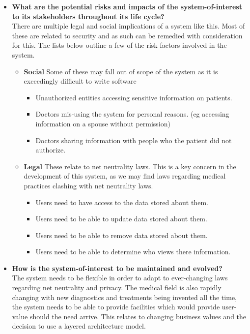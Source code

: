 \documentclass[10pt,oneside]{report}
\begin{document}
\begin{itemize}
\item \textbf{What are the potential risks and impacts of the system-of-interest to its stakeholders throughout its life cycle?} \\
There are multiple legal and social implications of a system like this. Most of these are related to security and as such can be remedied with consideration for this. The lists below outline a few of the risk factors involved in the system.
\begin{itemize}
	\item \textbf{Social}
		Some of these may fall out of scope of the system as it is exceedingly difficult to write software 
		\begin{itemize}
			\item Unauthorized entities accessing sensitive information on patients.
			\item Doctors mis-using the system for personal reasons. (eg accessing information on a spouse without permission)
			\item Doctors sharing information with people who the patient did not authorize.
		\end{itemize}
	\item \textbf{Legal}
		These relate to net neutrality laws. This is a key concern in the development of this system, as we may find laws regarding medical practices clashing with net neutrality laws.
		\begin{itemize}
			\item Users need to have access to the data stored about them.
			\item Users need to be able to update data stored about them.
			\item Users need to be able to remove data stored about them.
			\item Users need to be able to determine who views there information.
		\end{itemize}
\end{itemize}

\item \textbf{How is the system-of-interest to be maintained and evolved?} \\
The system needs to be flexible in order to adapt to ever-changing laws regarding net neutrality and privacy. The medical field is also rapidly changing with new diagnostics and treatments being invented all the time, the system needs to be able to provide facilities which would provide user-value should the need arrive. This relates to changing business values and the decision to use a layered architecture model.
\end{itemize}
\end{document}
